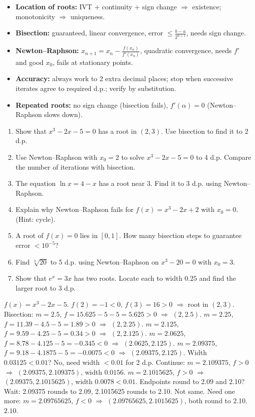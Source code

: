 \documentclass[11pt]{article}
\begin{document}
\begin{aretenir}
\begin{itemize}
\item \textbf{Location of roots:} IVT + continuity + sign change $\Rightarrow$ existence; monotonicity $\Rightarrow$ uniqueness.
\item \textbf{Bisection:} guaranteed, linear convergence, error $\leq \frac{b-a}{2^{n+1}}$, needs sign change.
\item \textbf{Newton--Raphson:} $x_{n+1}=x_n-\frac{f(x_n)}{f'(x_n)}$, quadratic convergence, needs $f'$ and good $x_0$, fails at stationary points.
\item \textbf{Accuracy:} always work to 2 extra decimal places; stop when successive iterates agree to required d.p.; verify by substitution.
\item \textbf{Repeated roots:} no sign change (bisection fails), $f'(\alpha)=0$ (Newton--Raphson slows down).
\end{itemize}
\end{aretenir}

\begin{exercice}
\begin{enumerate}
\item Show that $x^3-2x-5=0$ has a root in $(2,3)$. Use bisection to find it to 2 d.p.
\item Use Newton--Raphson with $x_0=2$ to solve $x^3-2x-5=0$ to 4 d.p. Compare the number of iterations with bisection.
\item The equation $\ln x = 4-x$ has a root near $3$. Find it to 3 d.p. using Newton--Raphson.
\item Explain why Newton--Raphson fails for $f(x)=x^3-2x+2$ with $x_0=0$. (Hint: cycle).
\item A root of $f(x)=0$ lies in $[0,1]$. How many bisection steps to guarantee error $<10^{-5}$?
\item Find $\sqrt[3]{20}$ to 5 d.p. using Newton--Raphson on $x^3-20=0$ with $x_0=3$.
\item Show that $e^x=3x$ has two roots. Locate each to width $0.25$ and find the larger root to 3 d.p.
\end{enumerate}
\end{exercice}

\begin{corrige}[Exercise 1]
$f(x)=x^3-2x-5$. $f(2)=-1<0$, $f(3)=16>0$ $\Rightarrow$ root in $(2,3)$.
Bisection: $m=2.5$, $f=15.625-5-5=5.625>0$ $\Rightarrow$ $(2,2.5)$.
$m=2.25$, $f=11.39-4.5-5=1.89>0$ $\Rightarrow$ $(2,2.25)$.
$m=2.125$, $f=9.59-4.25-5=0.34>0$ $\Rightarrow$ $(2,2.125)$.
$m=2.0625$, $f=8.78-4.125-5=-0.345<0$ $\Rightarrow$ $(2.0625,2.125)$.
$m=2.09375$, $f=9.18-4.1875-5=-0.0075<0$ $\Rightarrow$ $(2.09375,2.125)$.
Width $0.03125<0.01$? No, need width $<0.01$ for 2 d.p. Continue: $m=2.109375$, $f>0$ $\Rightarrow$ $(2.09375,2.109375)$, width $0.0156$. $m=2.1015625$, $f>0$ $\Rightarrow$ $(2.09375,2.1015625)$, width $0.0078<0.01$. Endpoints round to 2.09 and 2.10? Wait: 2.09375 rounds to 2.09, 2.1015625 rounds to 2.10. Not same. Need one more: $m=2.09765625$, $f<0$ $\Rightarrow$ $(2.09765625,2.1015625)$, both round to 2.10. $\boxed{2.10}$.
\end{corrige}
\end{document}
